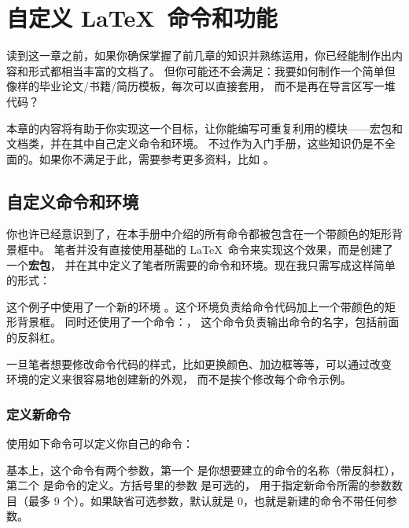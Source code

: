 \chapter{自定义 \LaTeX\ 命令和功能}

\begin{intro}
读到这一章之前，如果你确保掌握了前几章的知识并熟练运用，你已经能制作出内容和形式都相当丰富的文档了。
但你可能还不会满足：我要如何制作一个简单但像样的毕业论文/书籍/简历模板，每次可以直接套用，
而不是再在导言区写一堆代码？

本章的内容将有助于你实现这一个目标，让你能编写可重复利用的模块——宏包和文档类，并在其中自己定义命令和环境。
不过作为入门手册，这些知识仍是不全面的。如果你不满足于此，需要参考更多资料，比如 \cite{companion,clsguide}。
\end{intro}

\section{自定义命令和环境}\label{sec:newcommands}

你也许已经意识到了，在本手册中介绍的所有命令都被包含在一个带颜色的矩形背景框中。
笔者并没有直接使用基础的 \LaTeX\ 命令来实现这个效果，而是创建了一个\textbf{宏包}，
并在其中定义了笔者所需要的命令和环境。现在我只需写成这样简单的形式：

\begin{example}
\begin{command}
\end{command}
\end{example}

这个例子中使用了一个新的环境 。这个环境负责给命令代码加上一个带颜色的矩形背景框。
同时还使用了一个命令：， 这个命令负责输出命令的名字，包括前面的反斜杠。

一旦笔者想要修改命令代码的样式，比如更换颜色、加边框等等，可以通过改变  环境的定义来很容易地创建新的外观，
而不是挨个修改每个命令示例。

\subsection{定义新命令}

使用如下命令可以定义你自己的命令：
\begin{command}
\end{command}
基本上，这个命令有两个参数，第一个  是你想要建立的命令的名称（带反斜杠），
第二个  是命令的定义。方括号里的参数  是可选的，
用于指定新命令所需的参数数目（最多 9 个）。如果缺省可选参数，默认就是 0，也就是新建的命令不带任何参数。

